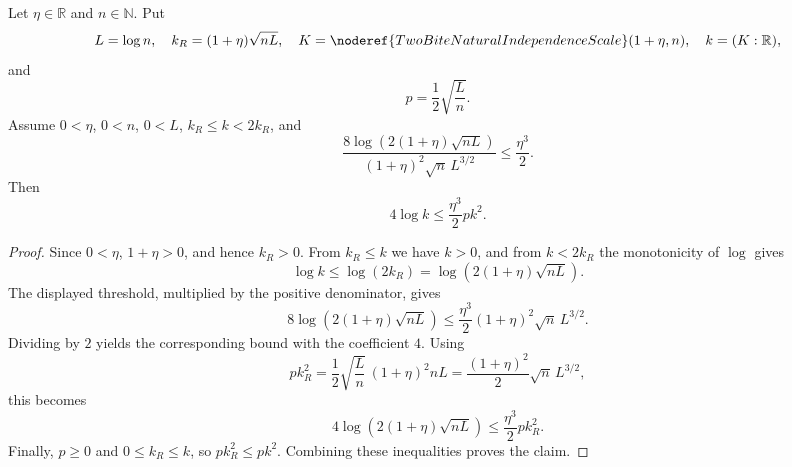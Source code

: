 \begin{helper}
Let \(\eta\in\mathbb R\) and \(n\in\mathbb N\).  Put
\[
L=\log n,\quad
k_R=(1+\eta)\sqrt{nL},\quad
K=\noderef{TwoBiteNaturalIndependenceScale}(1+\eta,n),\quad
k=(K:\mathbb R),
\]
and
\[
p=\frac12\sqrt{\frac Ln}.
\]
Assume \(0<\eta\), \(0<n\), \(0<L\), \(k_R\le k<2k_R\), and
\[
\frac{8\log(2(1+\eta)\sqrt{nL})}
{(1+\eta)^2\sqrt n\,L^{3/2}}
\le\frac{\eta^3}{2}.
\]
Then
\[
4\log k\le\frac{\eta^3}{2}pk^2.
\]
\end{helper}
\begin{proof}
Since \(0<\eta\), \(1+\eta>0\), and hence \(k_R>0\).  From
\(k_R\le k\) we have \(k>0\), and from \(k<2k_R\) the monotonicity of
\(\log\) gives
\[
\log k\le \log(2k_R)
=\log(2(1+\eta)\sqrt{nL}).
\]
The displayed threshold, multiplied by the positive denominator, gives
\[
8\log(2(1+\eta)\sqrt{nL})
\le \frac{\eta^3}{2}(1+\eta)^2\sqrt n\,L^{3/2}.
\]
Dividing by \(2\) yields the corresponding bound with the coefficient \(4\).
Using
\[
pk_R^2
=\frac12\sqrt{\frac Ln}\,(1+\eta)^2 nL
=\frac{(1+\eta)^2}{2}\sqrt n\,L^{3/2},
\]
this becomes
\[
4\log(2(1+\eta)\sqrt{nL})
\le \frac{\eta^3}{2}p k_R^2.
\]
Finally, \(p\ge0\) and \(0\le k_R\le k\), so \(p k_R^2\le p k^2\).
Combining these inequalities proves the claim.
\end{proof}
